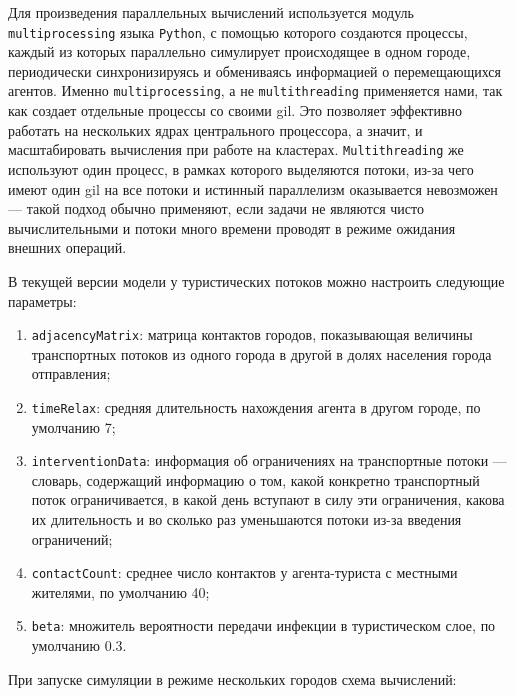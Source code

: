 \documentclass[a4paper,12pt]{article} %
\begin{document}
Для произведения параллельных вычислений используется модуль \texttt{multiproces\-sing} языка \texttt{Pyt\-hon}, с помощью которого создаются процессы, каждый из которых параллельно симулирует происходящее в одном городе, периодически синхронизируясь и обмениваясь информацией о перемещающихся агентов. Именно \texttt{multiprocessing}, а не \texttt{multithreading} применяется нами, так как создает отдельные процессы со своими \gls{gil}. Это позволяет эффективно работать на нескольких ядрах центрального процессора, а значит, и масштабировать вычисления при работе на кластерах. \texttt{Multithreading} же используют один процесс, в рамках которого выделяются потоки, из-за чего имеют один \gls{gil} на все потоки и истинный параллелизм оказывается невозможен --- такой подход обычно применяют, если задачи не являются чисто вычислительными и потоки много времени проводят в режиме ожидания внешних операций.

В текущей версии модели у туристических потоков можно настроить следующие параметры:

\begin{enumerate}
\item \texttt{adjacencyMatrix}: матрица контактов городов, показывающая величины транспортных потоков из одного города в другой в долях населения города отправления;
\item \texttt{timeRelax}:  средняя длительность нахождения агента в другом городе, по умолчанию 7;
\item \texttt{interventionData}: информация об ограничениях на транспортные потоки --- словарь, содержащий информацию о том, какой конкретно транспортный поток ограничивается, в какой день вступают в силу эти ограничения, какова их длительность и во сколько раз уменьшаются потоки из-за введения ограничений;
\item \texttt{contactCount}: среднее число контактов у агента-туриста с местными жителями, по умолчанию 40;
\item \texttt{beta}: множитель вероятности передачи инфекции в туристическом слое, по умолчанию 0.3.
\end{enumerate}

При запуске симуляции в режиме нескольких городов схема вычислений:
\end{document}
